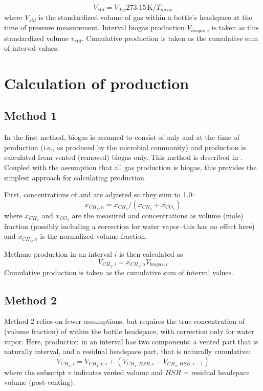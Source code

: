 \documentclass[]{article}
\newcommand{\unit}[1]{\ensuremath{\, \mathrm{#1}}}
\begin{document}
\begin{equation}
  \label{eq:bgstd}
  V_{std} = V_{dry} 273.15 \unit{K}/T_{meas}
\end{equation}
where $V_{std}$ is the standardized volume of gas within a bottle's headspace at the time of pressure measurement.
Interval biogas production $V_{biogas, i}$ is taken as this standardized volume $v_{std}$.
Cumulative production is taken as the cumulative sum of interval values. 

\section{Calculation of  production}
\subsection{Method 1}
In the first method, biogas is assumed to consist of only  and  at the time of production (i.e., as produced by the microbial community) and  production is calculated from vented (removed) biogas only.
This method is described in \cite{brian1991}.
Coupled with the assumption that all gas production is biogas, this provides the simplest approach for calculating  production.

First, concentrations of  and  are adjusted so they sum to 1.0:
\begin{equation}
  x_{CH_4, n} = x_{CH_4}/(x_{CH_4} + x_{CO_2})
\end{equation}
where $x_{CH_4}$ and $x_{CO_2}$ are the measured  and  concentrations as volume (mole) fraction (possibly including a correction for water vapor--this has no effect here) and $x_{CH_4, n}$ is the normalized  volume fraction.

Methane production in an interval $i$ is then calculated as
\begin{equation}
  V_{CH_4, i} = x_{CH_4, n} V_{biogas, i}
\end{equation}
Cumulative production is taken as the cumulative sum of interval values. 

\subsection{Method 2}
Method 2 relies on fewer assumptions, but requires the true concentration of  (volume fraction) of  within the bottle headspace, with correction only for water vapor.
Here,  production in an interval has two components: a vented part that is naturally interval, and a residual headspace part, that is naturally cumulative:
\begin{equation}
  V_{CH_4, i} = V_{CH_4, v, i} + ( V_{CH_4, HSR, i} - V_{CH_4, HSR, i-1} )
\end{equation}
where the subscript $v$ indicates vented volume and $HSR$ = residual headspace volume (post-venting).
\end{document}
